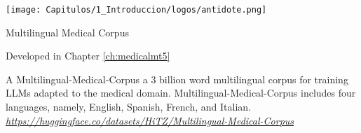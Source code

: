 \begin{resources}
    {
    \begin{adjustbox}{valign=c}
    \texttt{[image: Capitulos/1\_Introduccion/logos/antidote.png]}
    \end{adjustbox}
    \begin{adjustbox}{valign=c}
    \begin{minipage}{\textwidth}
    Multilingual Medical Corpus
    \end{minipage}
    \end{adjustbox}
    }
    \begin{resourcessmall}
    Developed in Chapter \ref{ch:medicalmt5}
    \end{resourcessmall}
    A Multilingual-Medical-Corpus a 3 billion word multilingual corpus for training LLMs adapted to the medical domain. Multilingual-Medical-Corpus includes four languages, namely, English, Spanish, French, and Italian.  \\
    \textit{\href{https://huggingface.co/datasets/HiTZ/Multilingual-Medical-Corpus}{https://huggingface.co/datasets/HiTZ/Multilingual-Medical-Corpus}}
\end{resources}


